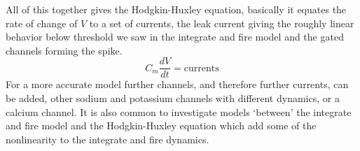 \documentclass[11pt,a4paper]{scrartcl}
\begin{document}
All of this together gives the Hodgkin-Huxley equation, basically it
equates the rate of change of $V$ to a set of currents, the leak
current giving the roughly linear behavior below threshold we saw in
the integrate and fire model and the gated channels forming the
spike.
\begin{equation}
C_m\frac{dV}{dt}=\mbox{currents}
\end{equation}
For a more accurate model further channels, and therefore further
currents, can be added, other sodium and potassium channels with
different dynamics, or a calcium channel. It is also common to
investigate models \lq{}between\rq{} the integrate and fire model and
the Hodgkin-Huxley equation which add some of the nonlinearity to the
integrate and fire dynamics.
\end{document}

